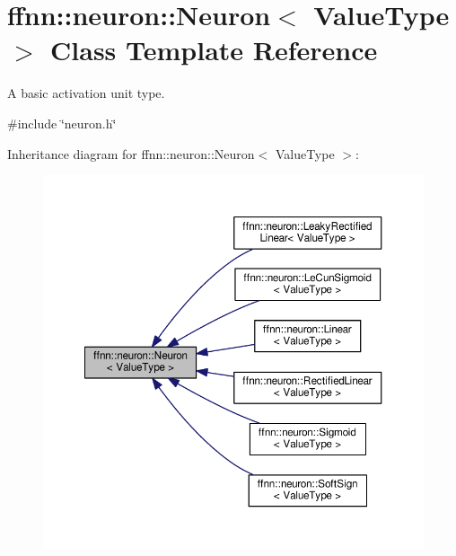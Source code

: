 \hypertarget{classffnn_1_1neuron_1_1_neuron}{\section{ffnn\-:\-:neuron\-:\-:Neuron$<$ Value\-Type $>$ Class Template Reference}
\label{classffnn_1_1neuron_1_1_neuron}
}


A basic activation unit type.  




{\ttfamily \#include \char`\"{}neuron.\-h\char`\"{}}



Inheritance diagram for ffnn\-:\-:neuron\-:\-:Neuron$<$ Value\-Type $>$\-:\nopagebreak
\begin{figure}[H]
\begin{center}
\leavevmode
\includegraphics[width=350pt]{classffnn_1_1neuron_1_1_neuron__inherit__graph}
\end{center}
\end{figure}
